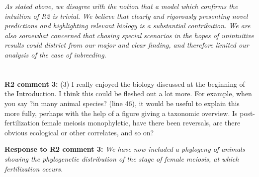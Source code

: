 \documentclass[12pt,letterpaper]{article}
\begin{document}
\emph{As stated above, we disagree with the notion that a model which confirms the intuition of R2 is trivial. We believe that clearly and rigorously presenting novel predictions and highlighting relevant biology is a substantial contribution. We are also somewhat concerned that chasing special scenarios in the hopes of unintuitive results could district from our major and clear finding, and therefore limited our analysis of the case of inbreeding.}
\\
\\
\\
{\bf{R2 comment 3:}}  (3) I really enjoyed the biology discussed at the beginning of the Introduction. I think this could be fleshed out a lot more. For example, when you say ?in many animal species? (line 46), it would be useful to explain this more fully, perhaps with the help of a figure giving a taxonomic overview. Is post-fertilization female meiosis monophyletic, have there been reversals, are there obvious ecological or other correlates, and so on?

{\bf{Response to R2 comment 3:}}  \emph{We have now included a phylogeny of animals showing the phylogenetic distribution of the stage of female meiosis, at which fertilization occurs.}
\\
\end{document}
